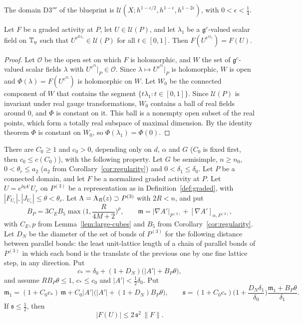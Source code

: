 The domain D3$'''$ of the blueprint is $\mathcal U(X;h^{1-\epsilon/2},h^{1-\epsilon},h^{1-2\epsilon})$, with $0<\epsilon<\frac14$.

\begin{lemma}\label{lem:complex-gauge}
Let $F$ be a graded activity at $P$, let $U\in\mathcal U(P)$, and let $\lambda_1$ be a $\mathfrak g^c$-valued scalar field on $\mathbb T_\eta$ such that $U^{e^{\ii t\lambda_1}}\in\mathcal U(P)$ for all $t\in[0,1]$. Then $F(U^{e^{\ii\lambda_1}})=F(U)$.
\end{lemma}

\begin{proof}
Let $\mathcal O$ be the open set on which $F$ is holomorphic, and $W$ the set of $\mathfrak g^c$-valued scalar fields $\lambda$ with $U^{e^{\ii\lambda}}|_P\in\mathcal O$. Since $\lambda\mapsto U^{e^{\ii\lambda}}|_P$ is holomorphic, $W$ is open and $\Phi(\lambda)=F(U^{e^{\ii\lambda}})$ is holomorphic on $W$. Let $W_0$ be the connected component of $W$ that contains the segment $\{t\lambda_1:t\in[0,1]\}$. Since $\mathcal U(P)$ is invariant under real gauge transformations, $W_0$ contains a ball of real fields around $0$, and $\Phi$ is constant on it. This ball is a nonempty open subset of the real points, which form a totally real subspace of maximal dimension. By the identity theorem $\Phi$ is constant on $W_0$, so $\Phi(\lambda_1)=\Phi(0)$.
\end{proof}

\begin{lemma}\label{lem:quadratic-bound}
There are $C_0\ge1$ and $c_0>0$, depending only on $d$, $\alpha$ and $G$ ($C_0$ is fixed first, then $c_0\le c(C_0)$), with the following property. Let $G$ be semisimple, $n\ge n_0$, $0<\theta_r\le a_2$ ($a_2$ from Corollary~\ref{cor:regularity}) and $0<\delta_1\le\delta_0$. Let $P$ be a connected domain, and let $F$ be a normalized graded activity at $P$. Let $U=e^{\ii\eta A'}U_r$ on $P^{(3)}$ be a representation as in Definition~\ref{def:graded}, with $|F_{U_r}|,|J_{U_r}|\le\theta<\theta_r$. Let $\Lambda=\Lambda_R(z)\supset P^{(3)}$ with $2R<n$, and put
\[
B_P=3C_EB_5\max\Big(1,\frac R{4M+2}\Big)^p,\qquad\mathfrak m=|\nabla A'|_{P^{(3)}}+[\nabla A']_{\alpha,P^{(3)}},
\]
with $C_E,p$ from Lemma~\ref{lem:large-cubes} and $B_5$ from Corollary~\ref{cor:regularity}. Let $D_N$ be the diameter of the set of bonds of $P^{(3)}$ for the following distance between parallel bonds: the least unit-lattice length of a chain of parallel bonds of $P^{(3)}$ in which each bond is the translate of the previous one by one fine lattice step, in any direction. Put
\[
c_*=\delta_0+(1+D_N)\big(|A'|+B_P\theta\big),
\]
and assume $RB_P\theta\le1$, $c_*\le c_0$ and $|A'|<\frac12\delta_0$. Put
\[
\mathfrak m_1=(1+C_0c_*)\,\mathfrak m+C_0|A'|\big(|A'|+(1+D_N)B_P\theta\big),\qquad\mathfrak s=(1+C_0c_*)\Big(1+\frac{D_N\delta_1}{\delta_0}\Big)\frac{\mathfrak m_1+B_P\theta}{\delta_1}.
\]
If $\mathfrak s\le\frac12$, then
\[
|F(U)|\le2\,\mathfrak s^2\,\|F\| .
\]
\end{lemma}

